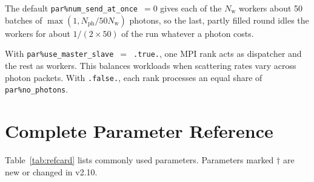 \documentclass[english,a4paper]{my_memo}
\newcommand{\parm}[1]{\texttt{par\%#1}}
\begin{document}
The default \parm{num\_send\_at\_once}~$=0$ gives each of the $N_\mathrm{w}$ workers about 50
batches of $\max(1, N_\mathrm{ph}/50N_\mathrm{w})$ photons, so the last, partly filled round idles the
workers for about $1/(2\times50)$ of the run whatever a photon costs.

With \parm{use\_master\_slave}~$=$~\texttt{.true.}, one MPI rank acts as dispatcher and
the rest as workers.  This balances workloads when scattering rates vary across photon
packets.  With \texttt{.false.}, each rank processes an equal share of \parm{no\_photons}.

\section{Complete Parameter Reference}
\label{sec:refcard}

Table~\ref{tab:refcard} lists commonly used parameters.  Parameters marked
$\dagger$ are new or changed in v2.10.
\end{document}
